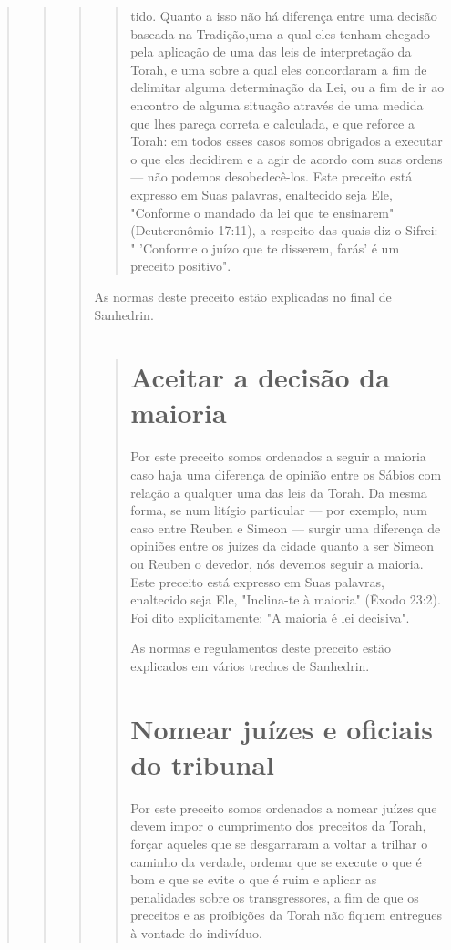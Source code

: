 \begin{quote}
\begin{quote}
\begin{quote}
\begin{quote}
tido. Quanto a isso não há diferença entre uma decisão baseada na
Tradição,uma a qual eles tenham chegado pela aplicação de uma das leis
de interpretação da Torah, e uma sobre a qual eles concordaram a fim de
delimitar alguma determi­nação da Lei, ou a fim de ir ao encontro de
alguma situação através de uma medida que lhes pareça correta e
calculada, e que reforce a Torah: em todos esses casos somos obrigados a
executar o que eles decidirem e a agir de acordo com suas ordens --- não
podemos desobedecê-los. Este preceito está expresso em Suas palavras,
enaltecido seja Ele, "Conforme o mandado da lei que te ensi­narem"
(Deuteronômio 17:11), a respeito das quais diz o Sifrei: " 'Conforme o
juízo que te disserem, farás' é um preceito positivo".
\end{quote}

As normas deste preceito estão explicadas no final de Sanhedrin.

\begin{quote}
\section{Aceitar a decisão da maioria}

Por este preceito somos ordenados a seguir a maioria caso haja uma
diferença de opinião entre os Sábios com relação a qualquer uma das leis
da Torah. Da mesma forma, se num litígio particular --- por exemplo, num
caso entre Reuben e Simeon --- surgir uma diferença de opiniões entre os
juízes da cidade quanto a ser Simeon ou Reuben o devedor, nós devemos
seguir a maio­ria. Este preceito está expresso em Suas palavras,
enaltecido seja Ele, "Inclina-te à maioria" (Êxodo 23:2). Foi dito
explicitamente: "A maioria é lei decisiva".

As normas e regulamentos deste preceito estão explicados em vá­rios
trechos de Sanhedrin.

\section{Nomear juízes e oficiais do tribunal}

Por este preceito somos ordenados a nomear juízes que devem im­por o
cumprimento dos preceitos da Torah, forçar aqueles que se desgarraram a
voltar a trilhar o caminho da verdade, ordenar que se execute o que é
bom e que se evite o que é ruim e aplicar as penalidades sobre os
transgressores, a fim de que os preceitos e as proibições da Torah não
fiquem entregues à von­tade do indivíduo.


\end{quote}
\end{quote}
\end{quote}
\end{quote}
